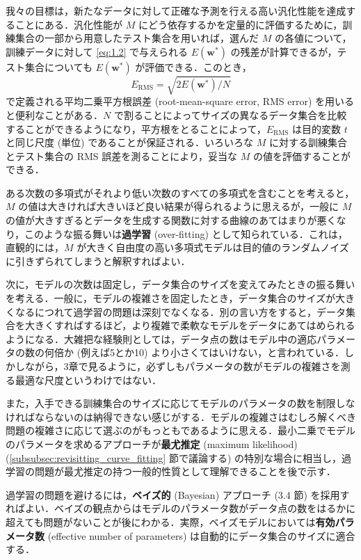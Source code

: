 \documentclass[uplatex,a4paper,oneside,openany,dvipdfmx]{jsarticle}
\numberwithin{equation}{section}
\theoremstyle{mystyle} %
\newcommand{\mr}[1]{\mathrm{#1}}
\newcommand{\tb}[1]{\textbf{#1}}
\newcommand{\bs}[1]{\boldsymbol{#1}}
\begin{document}
我々の目標は，新たなデータに対して正確な予測を行える高い汎化性能を達成することにある．汎化性能が $M$ にどう依存するかを定量的に評価するために，訓練集合の一部から用意したテスト集合を用いれば，選んだ $M$ の各値について，訓練データに対して \eqref{eq:1.2} で与えられる $E(\bs{w}^{\ast})$ の残差が計算できるが，テスト集合についても $E(\bs{w}^{\ast})$ が評価できる．このとき，
\begin{equation} \label{eq:1.3}
    E_{\mr{RMS}} = \sqrt{2E(\bs{w}^{\ast})/N}
\end{equation}
で定義される平均二乗平方根誤差 (root-mean-square error, RMS error) を用いると便利なことがある．$N$ で割ることによってサイズの異なるデータ集合を比較することができるようになり，平方根をとることによって，$E_{\mr{RMS}}$ は目的変数 $t$ と同じ尺度 (単位) であることが保証される．いろいろな $M$ に対する訓練集合とテスト集合の RMS 誤差を測ることにより，妥当な $M$ の値を評価することができる．

ある次数の多項式がそれより低い次数のすべての多項式を含むことを考えると，$M$ の値は大きければ大きいほど良い結果が得られるように思えるが，一般に $M$ の値が大きすぎるとデータを生成する関数に対する曲線のあてはまりが悪くなり，このような振る舞いは\tb{過学習} (over-fitting) として知られている．これは，直観的には，$M$ が大きく自由度の高い多項式モデルは目的値のランダムノイズに引きずられてしまうと解釈すればよい．

次に，モデルの次数は固定し，データ集合のサイズを変えてみたときの振る舞いを考える．一般に，モデルの複雑さを固定したとき，データ集合のサイズが大きくなるにつれて過学習の問題は深刻でなくなる．別の言い方をすると，データ集合を大きくすればするほど，より複雑で柔軟なモデルをデータにあてはめられるようになる．大雑把な経験則としては，データ点の数はモデル中の適応パラメータの数の何倍か (例えば5とか10) より小さくてはいけない，と言われている．しかしながら，3章で見るように，必ずしもパラメータの数がモデルの複雑さを測る最適な尺度というわけではない．

また，入手できる訓練集合のサイズに応じてモデルのパラメータの数を制限しなければならないのは納得できない感じがする．モデルの複雑さはむしろ解くべき問題の複雑さに応じて選ぶのがもっともであるように思える．最小二乗でモデルのパラメータを求めるアプローチが\tb{最尤推定} (maximum likelihood) (\ref{subsubsec:revisitting_curve_fitting} 節で議論する) の特別な場合に相当し，過学習の問題が最尤推定の持つ一般的性質として理解できることを後で示す．

過学習の問題を避けるには，\tb{ベイズ的} (Bayesian) アプローチ (3.4 節) を採用すればよい．ベイズの観点からはモデルのパラメータ数がデータ点の数をはるかに超えても問題がないことが後にわかる．実際，ベイズモデルにおいては\tb{有効パラメータ数} (effective number of parameters) は自動的にデータ集合のサイズに適合する．
\end{document}
